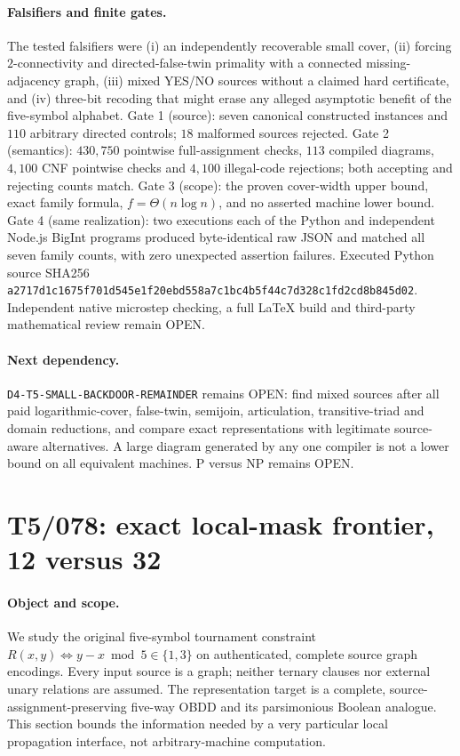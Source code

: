 \documentclass[11pt]{article}
\begin{document}
\paragraph{Falsifiers and finite gates.}
The tested falsifiers were (i) an independently recoverable
small cover, (ii) forcing $2$-connectivity and directed-false-twin
primality with a connected missing-adjacency graph, (iii) mixed
YES/NO sources without a claimed hard certificate, and
(iv) three-bit recoding that might erase any alleged asymptotic
benefit of the five-symbol alphabet.
Gate 1 (source): seven canonical constructed instances and
$110$ arbitrary directed controls; $18$ malformed sources rejected.
Gate 2 (semantics): $430{,}750$ pointwise full-assignment checks,
$113$ compiled diagrams, $4{,}100$ CNF pointwise checks and
$4{,}100$ illegal-code rejections; both accepting and rejecting
counts match. Gate 3 (scope): the proven cover-width upper bound,
exact family formula, $f=\Theta(n\log n)$, and no asserted
machine lower bound. Gate 4 (same realization): two executions
each of the Python and independent Node.js BigInt programs
produced byte-identical raw JSON and matched all seven family
counts, with zero unexpected assertion failures.
Executed Python source SHA256
\texttt{a2717d1c1675f701d545e1f20ebd558a7c1bc4b5f44c7d328c1fd2cd8b845d02}.
Independent native microstep checking, a full LaTeX build and
third-party mathematical review remain OPEN.

\paragraph{Next dependency.}
\texttt{D4-T5-SMALL-BACKDOOR-REMAINDER} remains OPEN:
find mixed sources after all paid logarithmic-cover,
false-twin, semijoin, articulation, transitive-triad and
domain reductions, and compare exact representations with
legitimate source-aware alternatives. A large diagram generated
by any one compiler is not a lower bound on all equivalent
machines. P versus NP remains OPEN.


\section{T5/078: exact local-mask frontier, 12 versus 32}
\label{sec:t5mask078}

\paragraph{Object and scope.}
We study the original five-symbol tournament constraint
\(R(x,y)\iff y-x\bmod5\in\{1,3\}\) on authenticated,
complete source graph encodings. Every input source is a graph;
neither ternary clauses nor external unary relations are assumed.
The representation target is a complete, source-assignment-preserving
five-way OBDD and its parsimonious Boolean analogue.
This section bounds the information needed by a very particular
local propagation interface, not arbitrary-machine computation.
\end{document}
